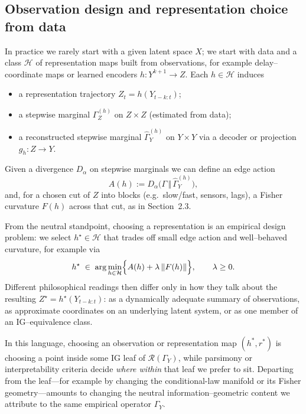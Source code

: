 \documentclass[11pt]{article}
\newcommand{\1}{\mathbf{1}}
\begin{document}
\subsection{Observation design and representation choice from data}

In practice we rarely start with a given latent space \(X\); we start with data and a class \(\mathcal{H}\) of representation maps built from observations, for example delay–coordinate maps or learned encoders \(h : Y^{k+1} \to Z\). Each \(h \in \mathcal{H}\) induces

\begin{itemize}
  \item a representation trajectory \(Z_t = h(Y_{t-k:t})\);
  \item a stepwise marginal \(\Gamma_Z^{(h)}\) on \(Z \times Z\) (estimated from data);
  \item a reconstructed stepwise marginal \(\widehat{\Gamma}^{(h)}_Y\) on \(Y \times Y\) via a decoder
        or projection \(g_h : Z \to Y\).
\end{itemize}

Given a divergence \(D_\alpha\) on stepwise marginals we can define an edge action
\[
  A(h) := D_\alpha\bigl(\Gamma \,\Vert\, \widehat{\Gamma}^{(h)}_Y\bigr),
\]
and, for a chosen cut of \(Z\) into blocks (e.g.\ slow/fast, sensors, lags), a Fisher curvature \(F(h)\) across that cut, as in Section~2.3.

From the neutral standpoint, choosing a representation is an empirical design problem: we select \(h^\star \in \mathcal{H}\) that trades off small edge action and well–behaved curvature, for example via
\[
  h^\star \;\in\;
  \arg\min_{h \in \mathcal{H}}
  \Bigl\{ A(h) + \lambda \,\|F(h)\| \Bigr\},
  \qquad \lambda \ge 0.
\]
Different philosophical readings then differ only in how they talk about the resulting \(Z^\star = h^\star(Y_{t-k:t})\): as a dynamically adequate summary of observations, as approximate coordinates on an underlying latent system, or as one member of an IG–equivalence class.

In this language, choosing an observation or representation map $(h^{*},r^{*})$ is choosing a point inside some IG leaf of $\mathcal{R}(\Gamma_Y)$, while parsimony or interpretability criteria decide \emph{where within} that leaf we prefer to sit. Departing from the leaf---for example by changing
the conditional-law manifold or its Fisher geometry---amounts to changing the neutral information--geometric content we attribute to the same empirical operator $\Gamma_Y$.
\end{document}
